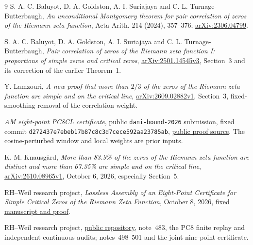 \documentclass[11pt,a4paper]{article}
\theoremstyle{remark}
\begin{document}
\begin{thebibliography}{9}
S. A. C. Baluyot, D. A. Goldston, A. I. Suriajaya and
C. L. Turnage-Butterbaugh,
\emph{An unconditional Montgomery theorem for pair correlation of
zeros of the Riemann zeta function},
Acta Arith. 214 (2024), 357--376;
\href{https://arxiv.org/abs/2306.04799}{arXiv:2306.04799}.

S. A. C. Baluyot, D. A. Goldston, A. I. Suriajaya and
C. L. Turnage-Butterbaugh,
\emph{Pair correlation of zeros of the Riemann zeta function I:
proportions of simple zeros and critical zeros},
\href{https://arxiv.org/abs/2501.14545v3}{arXiv:2501.14545v3},
Section~3 and its correction of the earlier Theorem~1.

Y. Lamzouri,
\emph{A new proof that more than $2/3$ of the zeros of the Riemann
zeta function are simple and on the critical line},
\href{https://arxiv.org/abs/2609.02882v1}{arXiv:2609.02882v1},
Section~3, fixed-smoothing removal of the correlation weight.

\emph{AM eight-point PC8CL certificate}, public
\texttt{dani-bound-2026} submission, fixed commit
\texttt{d272437e7ebeb17b87c8c3d7cece592aa23785ab},
\href{https://github.com/josusanmartin/riemann/tree/d272437e7ebeb17b87c8c3d7cece592aa23785ab/submissions/dani-bound-2026/proof}{public proof source}.
The cosine-perturbed window and local weights are prior inputs.

K. M. Knausg{\aa}rd,
\emph{More than 83.9\% of the zeros of the Riemann zeta function
are distinct and more than 67.35\% are simple and on the critical line},
\href{https://arxiv.org/abs/2610.08965v1}{arXiv:2610.08965v1},
October 6, 2026, especially Section~5.

RH--Weil research project,
\emph{Lossless Assembly of an Eight-Point Certificate for Simple
Critical Zeros of the Riemann Zeta Function}, October 8, 2026,
\href{https://github.com/lixiang90/RH-Weil/blob/0f7e6c21769b7a848fc9ce4cbf498eb91184874d/papers/lossless-eight-point-simple-critical-paper.tex}{fixed manuscript and proof}.

RH--Weil research project,
\href{https://github.com/lixiang90/RH-Weil}{public repository},
note~483, the PC8 finite replay and independent continuous audits;
notes~498--501 and the joint nine-point certificate.
\end{thebibliography}
\end{document}
